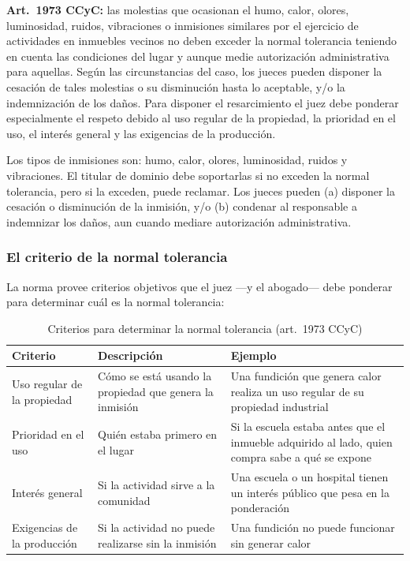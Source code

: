 \documentclass[12pt,oneside]{book}
\begin{document}
\textbf{Art.~1973 CCyC:} las molestias que ocasionan el humo, calor, olores, luminosidad, ruidos, vibraciones o inmisiones similares por el ejercicio de actividades en inmuebles vecinos no deben exceder la normal tolerancia teniendo en cuenta las condiciones del lugar y aunque medie autorización administrativa para aquellas. Según las circunstancias del caso, los jueces pueden disponer la cesación de tales molestias o su disminución hasta lo aceptable, y/o la indemnización de los daños. Para disponer el resarcimiento el juez debe ponderar especialmente el respeto debido al uso regular de la propiedad, la prioridad en el uso, el interés general y las exigencias de la producción.

Los tipos de inmisiones son: humo, calor, olores, luminosidad, ruidos y vibraciones. El titular de dominio debe soportarlas si no exceden la normal tolerancia, pero si la exceden, puede reclamar. Los jueces pueden (a) disponer la cesación o disminución de la inmisión, y/o (b) condenar al responsable a indemnizar los daños, aun cuando mediare autorización administrativa.

\subsubsection{El criterio de la normal tolerancia}

La norma provee criterios objetivos que el juez ---y el abogado--- debe ponderar para determinar cuál es la normal tolerancia:

\begin{table}[H]
\centering
\caption{Criterios para determinar la normal tolerancia (art.~1973 CCyC)}
\small
\begin{tabularx}{\textwidth}{
    >{\raggedright\arraybackslash}p{}
    >{\raggedright\arraybackslash}X
    >{\raggedright\arraybackslash}X
}
\toprule
\textbf{Criterio} & \textbf{Descripción} & \textbf{Ejemplo} \\
\midrule
Uso regular de la propiedad & Cómo se está usando la propiedad que genera la inmisión & Una fundición que genera calor realiza un uso regular de su propiedad industrial \\
Prioridad en el uso & Quién estaba primero en el lugar & Si la escuela estaba antes que el inmueble adquirido al lado, quien compra sabe a qué se expone \\
Interés general & Si la actividad sirve a la comunidad & Una escuela o un hospital tienen un interés público que pesa en la ponderación \\
Exigencias de la producción & Si la actividad no puede realizarse sin la inmisión & Una fundición no puede funcionar sin generar calor \\
\bottomrule
\end{tabularx}
\end{table}
\end{document}
